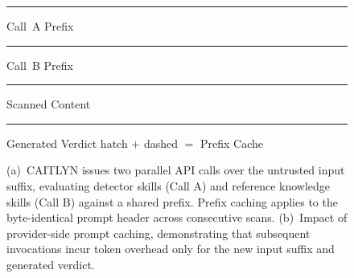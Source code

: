 \begin{figure}[!ht]
\vspace{3pt}
{\sffamily\scriptsize\color{F2Mute}
\textcolor{F2Blue}{\rule{7pt}{7pt}} Call~A Prefix \quad
\textcolor{F2Teal}{\rule{7pt}{7pt}} Call~B Prefix \quad
\textcolor{F2Red}{\rule{7pt}{7pt}} Scanned Content \quad
\textcolor{F2Green}{\rule{7pt}{7pt}} Generated Verdict \quad
hatch $+$ dashed $=$ Prefix Cache}


\caption{
  (a)~CAITLYN issues two parallel API calls over the
  untrusted input suffix, evaluating detector skills (Call A) and
  reference knowledge skills (Call B) against a shared prefix. Prefix
  caching applies to the byte-identical prompt header across
  consecutive scans. (b)~Impact of provider-side prompt caching,
  demonstrating that subsequent invocations incur token overhead
  only for the new input suffix and generated verdict.}

\label{fig:Tier1Prompt}
\end{figure}
